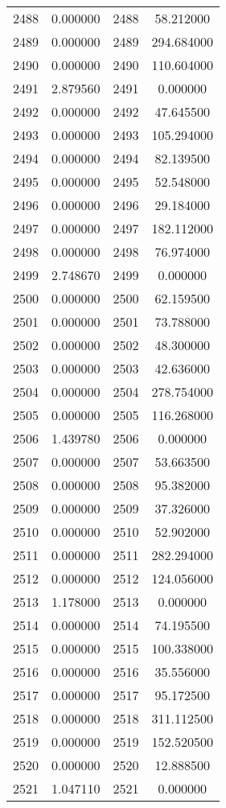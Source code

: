\documentclass[12pt]{article}
\begin{document}
\begin{longtable}{@{}cccc@{}}
2488 & 0.000000 & 2488 & 58.212000 \\
2489 & 0.000000 & 2489 & 294.684000 \\
2490 & 0.000000 & 2490 & 110.604000 \\
2491 & 2.879560 & 2491 & 0.000000 \\
2492 & 0.000000 & 2492 & 47.645500 \\
2493 & 0.000000 & 2493 & 105.294000 \\
2494 & 0.000000 & 2494 & 82.139500 \\
2495 & 0.000000 & 2495 & 52.548000 \\
2496 & 0.000000 & 2496 & 29.184000 \\
2497 & 0.000000 & 2497 & 182.112000 \\
2498 & 0.000000 & 2498 & 76.974000 \\
2499 & 2.748670 & 2499 & 0.000000 \\
2500 & 0.000000 & 2500 & 62.159500 \\
2501 & 0.000000 & 2501 & 73.788000 \\
2502 & 0.000000 & 2502 & 48.300000 \\
2503 & 0.000000 & 2503 & 42.636000 \\
2504 & 0.000000 & 2504 & 278.754000 \\
2505 & 0.000000 & 2505 & 116.268000 \\
2506 & 1.439780 & 2506 & 0.000000 \\
2507 & 0.000000 & 2507 & 53.663500 \\
2508 & 0.000000 & 2508 & 95.382000 \\
2509 & 0.000000 & 2509 & 37.326000 \\
2510 & 0.000000 & 2510 & 52.902000 \\
2511 & 0.000000 & 2511 & 282.294000 \\
2512 & 0.000000 & 2512 & 124.056000 \\
2513 & 1.178000 & 2513 & 0.000000 \\
2514 & 0.000000 & 2514 & 74.195500 \\
2515 & 0.000000 & 2515 & 100.338000 \\
2516 & 0.000000 & 2516 & 35.556000 \\
2517 & 0.000000 & 2517 & 95.172500 \\
2518 & 0.000000 & 2518 & 311.112500 \\
2519 & 0.000000 & 2519 & 152.520500 \\
2520 & 0.000000 & 2520 & 12.888500 \\
2521 & 1.047110 & 2521 & 0.000000 \\

\end{longtable}
\end{document}

